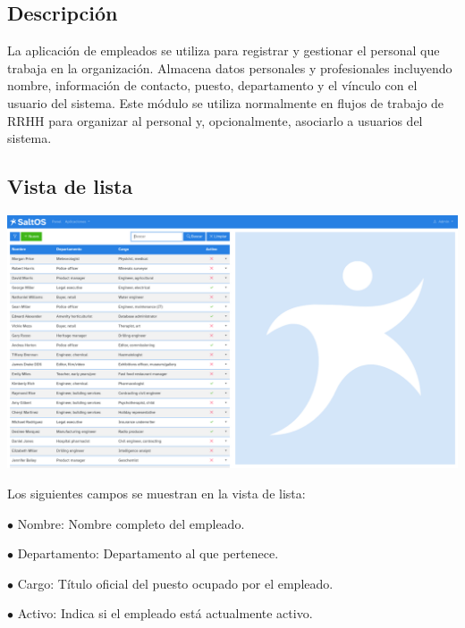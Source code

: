\documentclass[a4paper]{article}
\begin{document}
\hypertarget{toc107}{}
\subsection{Descripción}

La aplicación de empleados se utiliza para registrar y gestionar el personal que trabaja en la organización.
Almacena datos personales y profesionales incluyendo nombre, información de contacto, puesto, departamento y el vínculo con el usuario del sistema.
Este módulo se utiliza normalmente en flujos de trabajo de RRHH para organizar al personal y, opcionalmente, asociarlo a usuarios del sistema.

\hypertarget{toc108}{}
\subsection{Vista de lista}

\begin{center}\includegraphics[width=1\textwidth]{../ujest/snaps/test-screenshots-js-screenshots-hr-employees-list-es-es-1-snap.png}\end{center}

Los siguientes campos se muestran en la vista de lista:

\begin{compactitem}
\item[\color{myblue}$\bullet$] Nombre: Nombre completo del empleado.
\item[\color{myblue}$\bullet$] Departamento: Departamento al que pertenece.
\item[\color{myblue}$\bullet$] Cargo: Título oficial del puesto ocupado por el empleado.
\item[\color{myblue}$\bullet$] Activo: Indica si el empleado está actualmente activo.
\end{compactitem}
\end{document}
